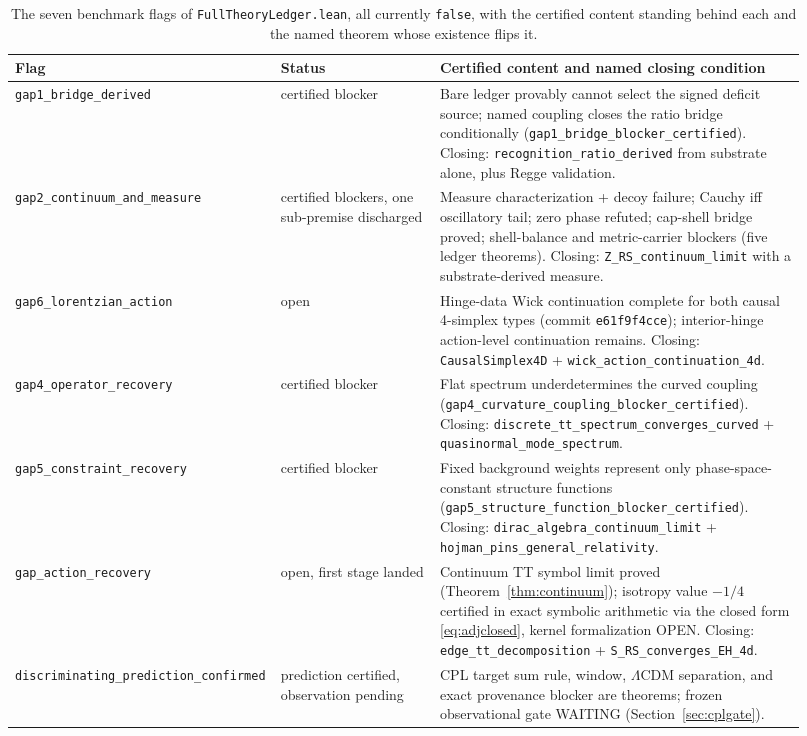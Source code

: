 \documentclass[11pt,letterpaper]{article}
\newcommand{\lean}[1]{\texttt{#1}}
\begin{document}
\begin{table}[ht]\centering\small
\begin{tabular}{p{0.26\linewidth}p{0.20\linewidth}p{0.46\linewidth}}
\toprule
Flag & Status & Certified content and named closing condition\\
\midrule
\lean{gap1\_bridge\_derived} & certified blocker & Bare ledger provably cannot select the signed deficit source; named coupling closes the ratio bridge conditionally (\lean{gap1\_bridge\_blocker\_certified}). Closing: \lean{recognition\_ratio\_derived} from substrate alone, plus Regge validation.\\
\lean{gap2\_continuum\_and\_measure} & certified blockers, one sub-premise discharged & Measure characterization + decoy failure; Cauchy iff oscillatory tail; zero phase refuted; cap-shell bridge proved; shell-balance and metric-carrier blockers (five ledger theorems). Closing: \lean{Z\_RS\_continuum\_limit} with a substrate-derived measure.\\
\lean{gap6\_lorentzian\_action} & open & Hinge-data Wick continuation complete for both causal 4-simplex types (commit \texttt{e61f9f4cce}); interior-hinge action-level continuation remains. Closing: \lean{CausalSimplex4D} + \lean{wick\_action\_continuation\_4d}.\\
\lean{gap4\_operator\_recovery} & certified blocker & Flat spectrum underdetermines the curved coupling (\lean{gap4\_curvature\_coupling\_blocker\_certified}). Closing: \lean{discrete\_tt\_spectrum\_converges\_curved} + \lean{quasinormal\_mode\_spectrum}.\\
\lean{gap5\_constraint\_recovery} & certified blocker & Fixed background weights represent only phase-space-constant structure functions (\lean{gap5\_structure\_function\_blocker\_certified}). Closing: \lean{dirac\_algebra\_continuum\_limit} + \lean{hojman\_pins\_general\_relativity}.\\
\lean{gap\_action\_recovery} & open, first stage landed & Continuum TT symbol limit proved (Theorem~\ref{thm:continuum}); isotropy value $-1/4$ certified in exact symbolic arithmetic via the closed form \eqref{eq:adjclosed}, kernel formalization OPEN. Closing: \lean{edge\_tt\_decomposition} + \lean{S\_RS\_converges\_EH\_4d}.\\
\lean{discriminating\_prediction\_confirmed} & prediction certified, observation pending & CPL target sum rule, window, $\Lambda$CDM separation, and exact provenance blocker are theorems; frozen observational gate WAITING (Section~\ref{sec:cplgate}).\\
\bottomrule
\end{tabular}
\caption{The seven benchmark flags of \lean{FullTheoryLedger.lean}, all currently \lean{false}, with the certified content standing behind each and the named theorem whose existence flips it.}
\label{tab:flags}
\end{table}
\end{document}

